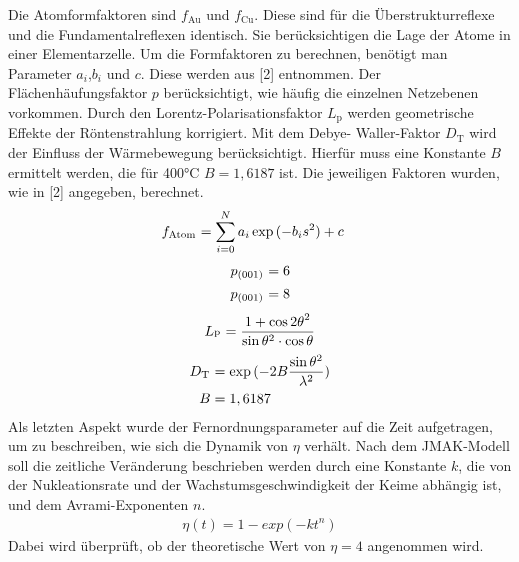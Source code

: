 \documentclass[
	a4paper,
	12pt,
	pagesize,
	ngerman
]{scrartcl}
\begin{document}
 Die Atomformfaktoren sind $f_\text{Au}$ und $f_\text{Cu}$. Diese sind für die Überstrukturreflexe und die Fundamentalreflexen identisch. Sie berücksichtigen die Lage der Atome in einer Elementarzelle. Um die Formfaktoren zu berechnen, benötigt man Parameter $a_i$,$b_i$ und $c$. Diese werden aus [2] entnommen.
 Der Flächenhäufungsfaktor $p$ berücksichtigt, wie häufig die einzelnen Netzebenen vorkommen. 
 Durch den Lorentz-Polarisationsfaktor $L_\text{p}$ werden geometrische Effekte der Röntenstrahlung korrigiert.
 Mit dem Debye- Waller-Faktor $D_\text{T}$ wird der Einfluss der Wärmebewegung berücksichtigt. Hierfür muss eine Konstante $B$ ermittelt werden, die für 400°C $B = 1,6187$ ist.
 Die jeweiligen Faktoren wurden, wie in [2] angegeben, berechnet. 
 \begin{align}
     f_\textsuperscript{Atom} &= \sum_{i=0}^N a_i\exp{(-b_is^2)} +c
 \end{align}
 \begin{align}
     p_\textsuperscript{(001)} &= 6 \\
     p_\textsuperscript{(001)} &= 8
 \end{align}
\begin{align}
    L_\textsuperscript{p} = \frac{1+\cos{2\theta}^2}{\sin{\theta}^2\cdot\cos{\theta}}
\end{align}
\begin{align}
    D_\textsuperscript{T} &= \exp{(-2B\frac{\sin{\theta}^2}{\lambda^2})} \\
    B &= 1,6187
\end{align}
Als letzten Aspekt wurde der Fernordnungsparameter auf die Zeit aufgetragen, um zu beschreiben, wie sich die Dynamik von $\eta$ verhält. Nach dem JMAK-Modell soll die zeitliche Veränderung beschrieben werden durch eine Konstante $k$, die von der Nukleationsrate und der Wachstumsgeschwindigkeit der Keime abhängig ist, und dem Avrami-Exponenten $n$.
\begin{align}
    \eta(t) = 1- exp(-kt^n)
\end{align}
Dabei wird überprüft, ob der theoretische Wert von $\eta = 4$ angenommen wird.
\end{document}

